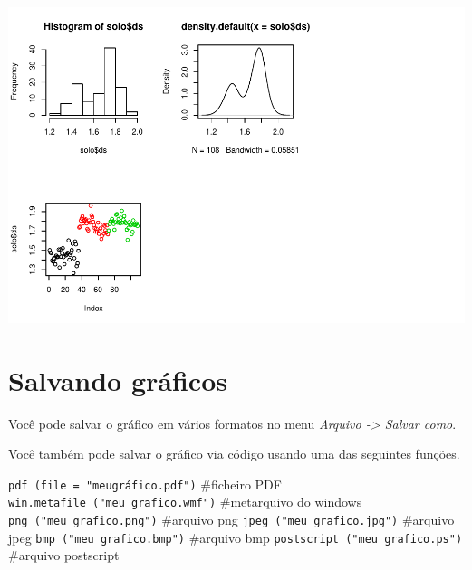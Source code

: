 \documentclass[]{book}
\begin{document}
\includegraphics{TudodoR_files/figure-latex/unnamed-chunk-181-2.pdf}

\hypertarget{salvando-graficos}{%
\section{Salvando gráficos}\label{salvando-graficos}}

Você pode salvar o gráfico em vários formatos no menu
\emph{Arquivo -\textgreater{} Salvar como}.

Você também pode salvar o gráfico via código usando uma das seguintes funções.

\texttt{pdf\ (file\ =\ "meugráfico.pdf")} \#ficheiro PDF
\texttt{win.metafile\ ("meu\ grafico.wmf")} \#metarquivo do windows
\texttt{png\ ("meu\ grafico.png")} \#arquivo png
\texttt{jpeg\ ("meu\ grafico.jpg")} \#arquivo jpeg
\texttt{bmp\ ("meu\ grafico.bmp")} \#arquivo bmp
\texttt{postscript\ ("meu\ grafico.ps")} \#arquivo postscript


\end{document}

